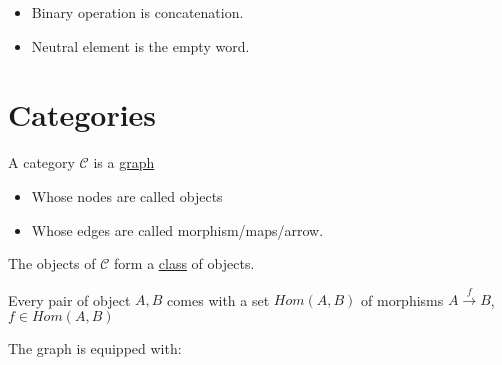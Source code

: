 \documentclass{article}
\theoremstyle{plain}
\begin{document}
  \begin{itemize}
    \item Binary operation is concatenation.
    \item Neutral element is the empty word.
  \end{itemize}

  \section{Categories}

   A category $\mathcal C$ is a \underline{graph}
    \begin{itemize}
      \item Whose nodes are called objects
      \item Whose edges are called morphism/maps/arrow.
    \end{itemize}

    The objects of $\mathcal C$ form a \underline{class} of objects.

    Every pair of object $A,B$ comes with a set $Hom(A, B)$ of morphisms
    $A \xrightarrow{f} B$, $f \in Hom(A, B)$

    The graph is equipped with:
\end{document}
